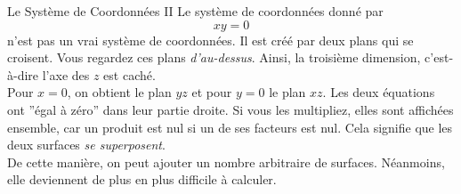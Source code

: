 \begin{surferPage}[Coordonées II]{Le Système de Coordonnées II}
Le système de coordonnées donné par
\[xy=0\]
n'est pas un vrai système de coordonnées. Il est créé par deux plans qui se croisent. Vous regardez ces plans {\it d'au-dessus}. Ainsi, la troisième dimension, c'est-à-dire l'axe des $z$ est caché. \\
\vspace{0.3cm}
Pour $x=0$, on obtient le plan $yz$ et pour $y=0$ le plan $xz$.
Les deux équations ont ''égal à zéro'' dans leur partie droite. Si vous les multipliez, elles sont affichées ensemble, car un produit est nul si un de ses facteurs est nul. Cela signifie que les deux surfaces {\it se superposent}. \\
De cette manière, on peut ajouter un nombre arbitraire de surfaces. Néanmoins, elle deviennent de plus en plus difficile à calculer.
\end{surferPage}

